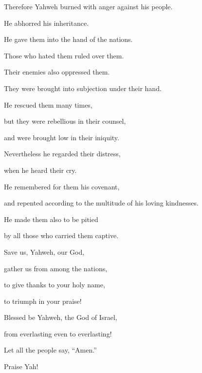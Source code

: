 {\par }{\Q {}Therefore Yahweh burned with anger against his people.
\par }{\QB He abhorred his inheritance.
\par }{\Q {}He gave them into the hand of the nations.
\par }{\QB Those who hated them ruled over them.
\par }{\Q {}Their enemies also oppressed them.
\par }{\QB They were brought into subjection under their hand.
\par }{\Q {}He rescued them many times,
\par }{\QB but they were rebellious in their counsel,
\par }{\QB and were brought low in their iniquity.
\par }{\Q {}Nevertheless he regarded their distress,
\par }{\QB when he heard their cry.
\par }{\Q {}He remembered for them his covenant,
\par }{\QB and repented according to the multitude of his loving kindnesses.
\par }{\Q {}He made them also to be pitied
\par }{\QB by all those who carried them captive.
\par }{\BB \par }{\Q {}Save us, Yahweh, our God,
\par }{\QB gather us from among the nations,
\par }{\QB to give thanks to your holy name,
\par }{\QB to triumph in your praise!
\par }{\BB \par }{\Q {}Blessed be Yahweh, the God of Israel,
\par }{\QB from everlasting even to everlasting!
\par }{\Q Let all the people say, “Amen.”
\par }{\Q Praise Yah!

}
